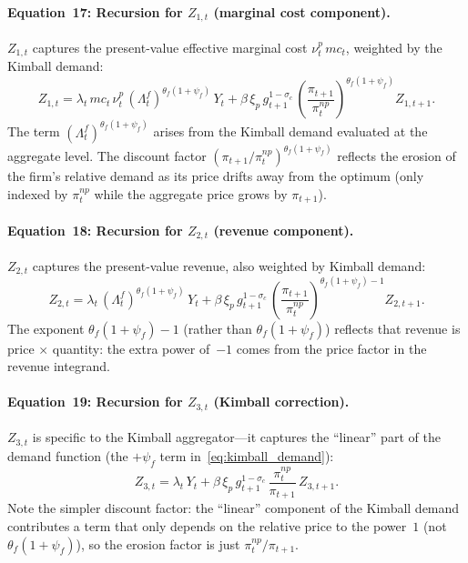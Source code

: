 \documentclass[11pt,a4paper]{article}
\begin{document}
\paragraph{Equation~17: Recursion for $Z_{1,t}$ (marginal cost component).}
$Z_{1,t}$ captures the present-value effective marginal cost
$\nu^p_t\,mc_t$, weighted by the Kimball demand:
\begin{equation}\label{eq:eq17}\tag{Eq.~17}
  \boxed{
  Z_{1,t} = \lambda_t\,mc_t\,\nu^p_t\,(\Lambda^f_t)^{\theta_f(1+\psi_f)}\,Y_t
  + \beta\,\xi_p\,g_{t+1}^{1-\sigma_c}\,
    \left(\frac{\pi_{t+1}}{\pi^{np}_t}\right)^{\!\theta_f(1+\psi_f)}\!Z_{1,t+1}.}
\end{equation}
The term $(\Lambda^f_t)^{\theta_f(1+\psi_f)}$ arises from the Kimball
demand evaluated at the aggregate level. The discount factor
$(\pi_{t+1}/\pi^{np}_t)^{\theta_f(1+\psi_f)}$ reflects the erosion of
the firm's relative demand as its price drifts away from the optimum
(only indexed by $\pi^{np}_t$ while the aggregate price grows
by $\pi_{t+1}$).

\paragraph{Equation~18: Recursion for $Z_{2,t}$ (revenue component).}
$Z_{2,t}$ captures the present-value revenue, also weighted by Kimball
demand:
\begin{equation}\label{eq:eq18}\tag{Eq.~18}
  \boxed{
  Z_{2,t} = \lambda_t\,(\Lambda^f_t)^{\theta_f(1+\psi_f)}\,Y_t
  + \beta\,\xi_p\,g_{t+1}^{1-\sigma_c}\,
    \left(\frac{\pi_{t+1}}{\pi^{np}_t}\right)^{\!\theta_f(1+\psi_f)-1}\!Z_{2,t+1}.}
\end{equation}
The exponent $\theta_f(1+\psi_f)-1$ (rather than $\theta_f(1+\psi_f)$)
reflects that revenue is price$\,\times\,$quantity: the extra power
of~$-1$ comes from the price factor in the revenue integrand.

\paragraph{Equation~19: Recursion for $Z_{3,t}$ (Kimball correction).}
$Z_{3,t}$ is specific to the Kimball aggregator---it captures the
``linear'' part of the demand function (the $+\psi_f$ term
in~\eqref{eq:kimball_demand}):
\begin{equation}\label{eq:eq19}\tag{Eq.~19}
  \boxed{
  Z_{3,t} = \lambda_t\,Y_t
  + \beta\,\xi_p\,g_{t+1}^{1-\sigma_c}\,
    \frac{\pi^{np}_t}{\pi_{t+1}}\,Z_{3,t+1}.}
\end{equation}
Note the simpler discount factor: the ``linear'' component of the
Kimball demand contributes a term that only depends on the relative
price to the power~$1$ (not~$\theta_f(1+\psi_f)$), so the erosion
factor is just $\pi^{np}_t/\pi_{t+1}$.
\end{document}
